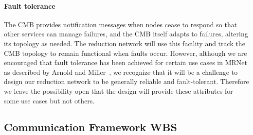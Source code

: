 \paragraph{Fault tolerance}
The CMB provides notification messages when nodes cease to respond
so that other services can manage failures, and the CMB itself adapts
to failures, altering its topology as needed.
The reduction network will use this facility and track the CMB topology
to remain functional when faults occur.
However, although we are encouraged that fault tolerance
has been achieved for certain use cases in MRNet as described by
Arnold and Miller~\cite{MrNetFail},
we recognize that it will be a challenge to design our reduction network
to be generally reliable and fault-tolerant.
Therefore we leave the possibility open that the design will provide
these attributes for some use cases but not others.
\ifcomments
{}
\fi

\ifwbs
\newpage
\subsection{Communication Framework WBS}\label{CommsFrameworkWBS}

